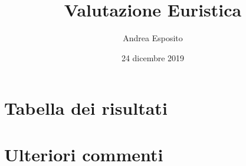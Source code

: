 \documentclass[french]{article}
\title{Valutazione Euristica}
\author{Andrea Esposito}
\date{24 dicembre 2019}
\begin{document}
\maketitle

\section{Tabella dei risultati}



\section{Ulteriori commenti}
\end{document}
